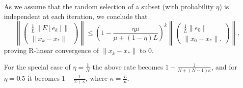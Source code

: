 \documentclass{article}
\begin{document}
\bigskip


As we assume that the random selection of a subset (with probability $\eta$) is independent at each iteration, we conclude that 
\[
 \left\|\begin{pmatrix} \displaystyle\frac{1}{L}\|E[e_k]\| \\
  \|x_k-x_\ast\|
 \end{pmatrix}\right\| \leq  \left(1-\displaystyle\frac{\eta\mu}{\mu+(1-\eta)L}\right)^k               
  \left\|\begin{pmatrix} \displaystyle\frac{1}{L}\|e_0\| \\
  \|x_0-x_\ast\|.
 \end{pmatrix} \right\|,
\]
proving R-linear convergence of $\|x_k-x_\ast\|$ to 0.

\bigskip

For the special case of $\eta=\displaystyle\frac{1}{N}$ the above rate becomes $1-\displaystyle\frac{1}{N+(N-1)\kappa}$, and for $\eta=0.5$ it becomes $1-\displaystyle\frac{1}{2+\kappa}$, where $\kappa=\displaystyle\frac{L}{\mu}$.
\end{document}
